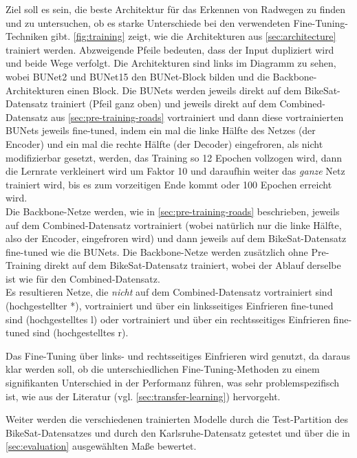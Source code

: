 Ziel soll es sein, die beste Architektur für das Erkennen von Radwegen zu finden und zu untersuchen,
ob es starke Unterschiede bei den verwendeten Fine-Tuning-Techniken gibt. 
\autoref{fig:training} zeigt, wie die Architekturen aus \autoref{sec:architecture} trainiert werden. 
Abzweigende Pfeile bedeuten, dass der Input dupliziert wird und beide Wege verfolgt. 
Die Architekturen sind links im Diagramm zu sehen, wobei \ac{BUNet2} und \ac{BUNet15} den \ac{BUNet}-Block 
bilden und die Backbone-Architekturen einen Block. Die \acp{BUNet} werden jeweils direkt auf 
dem BikeSat-Datensatz trainiert (Pfeil ganz oben) und jeweils direkt auf dem Combined-Datensatz aus \autoref{sec:pre-training-roads}
vortrainiert und dann diese vortrainierten \acp{BUNet} jeweils fine-tuned, indem ein mal die linke Hälfte des 
Netzes (der Encoder) und ein mal die rechte Hälfte (der Decoder) eingefroren, als nicht modifizierbar gesetzt, werden,
das Training so 12 Epochen vollzogen wird, dann die Lernrate verkleinert wird um Faktor 10 und daraufhin weiter 
das \textit{ganze} Netz trainiert wird, bis es zum vorzeitigen Ende kommt oder 100 Epochen erreicht wird. \\
Die Backbone-Netze werden, wie in \autoref{sec:pre-training-roads} beschrieben, jeweils auf dem Combined-Datensatz vortrainiert
(wobei natürlich nur die linke Hälfte, also der Encoder, eingefroren wird) und dann jeweils auf dem BikeSat-Datensatz 
fine-tuned wie die \acp{BUNet}. Die Backbone-Netze werden zusätzlich ohne Pre-Training direkt auf dem BikeSat-Datensatz 
trainiert, wobei der Ablauf derselbe ist wie für den Combined-Datensatz. \\
Es resultieren Netze, die \textit{nicht} auf dem Combined-Datensatz vortrainiert sind (hochgestellter *), 
vortrainiert und über ein linksseitiges Einfrieren fine-tuned sind (hochgestelltes l) oder vortrainiert und über ein 
rechtsseitiges Einfrieren fine-tuned sind (hochgestelltes r). 

Das Fine-Tuning über links- und rechtsseitiges Einfrieren wird genutzt, da daraus klar werden soll, ob die unterschiedlichen 
Fine-Tuning-Methoden zu einem signifikanten Unterschied in der Performanz führen, was sehr problemspezifisch ist, 
wie aus der Literatur (vgl. \autoref{sec:transfer-learning}) hervorgeht. 

Weiter werden die verschiedenen trainierten Modelle durch die Test-Partition des BikeSat-Datensatzes und durch den Karlsruhe-Datensatz 
getestet und über die in \autoref{sec:evaluation} ausgewählten Maße bewertet.


